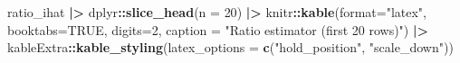 \documentclass[
]{article}
\newenvironment{Shaded}{\begin{snugshade}}{\end{snugshade}}
\newcommand{\AttributeTok}[1]{\textcolor[rgb]{0.13,0.29,0.53}{#1}}
\newcommand{\ConstantTok}[1]{\textcolor[rgb]{0.56,0.35,0.01}{#1}}
\newcommand{\DecValTok}[1]{\textcolor[rgb]{0.00,0.00,0.81}{#1}}
\newcommand{\FunctionTok}[1]{\textcolor[rgb]{0.13,0.29,0.53}{\textbf{#1}}}
\newcommand{\NormalTok}[1]{#1}
\newcommand{\SpecialCharTok}[1]{\textcolor[rgb]{0.81,0.36,0.00}{\textbf{#1}}}
\newcommand{\StringTok}[1]{\textcolor[rgb]{0.31,0.60,0.02}{#1}}
\begin{document}
\begin{Shaded}
\begin{Highlighting}[]
\NormalTok{ratio\_ihat }\SpecialCharTok{|\textgreater{}}   
\NormalTok{  dplyr}\SpecialCharTok{::}\FunctionTok{slice\_head}\NormalTok{(}\AttributeTok{n =} \DecValTok{20}\NormalTok{) }\SpecialCharTok{|\textgreater{}}
\NormalTok{  knitr}\SpecialCharTok{::}\FunctionTok{kable}\NormalTok{(}\AttributeTok{format=}\StringTok{"latex"}\NormalTok{, }\AttributeTok{booktabs=}\ConstantTok{TRUE}\NormalTok{, }\AttributeTok{digits=}\DecValTok{2}\NormalTok{,}
              \AttributeTok{caption =} \StringTok{"Ratio estimator (first 20 rows)"}\NormalTok{) }\SpecialCharTok{|\textgreater{}}
\NormalTok{  kableExtra}\SpecialCharTok{::}\FunctionTok{kable\_styling}\NormalTok{(}\AttributeTok{latex\_options =} \FunctionTok{c}\NormalTok{(}\StringTok{"hold\_position"}\NormalTok{, }\StringTok{"scale\_down"}\NormalTok{))}
\end{Highlighting}
\end{Shaded}
\end{document}
